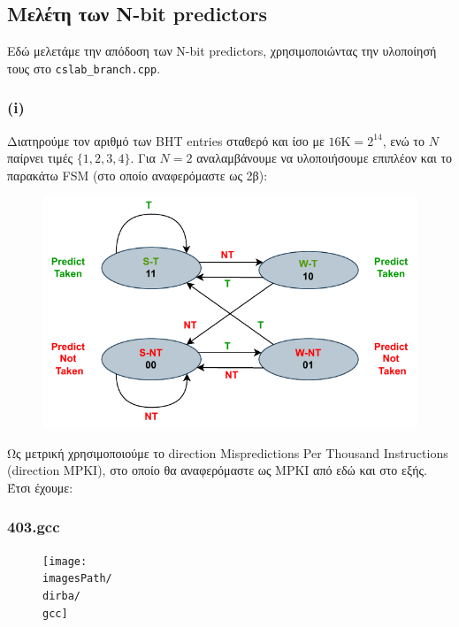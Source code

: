 \documentclass[12pt,a4paper]{article}
\newcommand{\imagesPath}{/home/nick/arch-ntua/ex02/graphs}
\newcommand{\gcc}{403.gcc.cslab_branch_predictors.out.pdf}
\newcommand{\dirba}{4.2/i}
\begin{document}
		\subsection{Μελέτη των N-bit predictors}
			Εδώ μελετάμε την απόδοση των N-bit predictors, χρησιμοποιώντας την υλοποίησή τους στο \verb|cslab_branch.cpp|.
		
			\subsubsection*{(i)}
				Διατηρούμε τον αριθμό των BHT entries σταθερό και ίσο με $16\text{K}=2^{14}$, ενώ το $N$ παίρνει τιμές $\{1, 2, 3, 4\}$. Για $N=2$ αναλαμβάνουμε να υλοποιήσουμε επιπλέον και το παρακάτω FSM (στο οποίο αναφερόμαστε ως 2β):
				
				\begin{figure}[H]
					\begin{center}
						\includegraphics[width=0.75\linewidth]{alternate-fsm.pdf}
					\end{center}
				\end{figure}
				
				Ως μετρική χρησιμοποιούμε το direction Mispredictions Per Thousand Instructions (direction MPKI), στο οποίο θα αναφερόμαστε ως MPKI από εδώ και στο εξής. Έτσι έχουμε:
				
				\subsubsection{403.gcc}
					\begin{figure}[H]
						\begin{center}
							 \texttt{[image: \\imagesPath/\\dirba/\\gcc]}
						\end{center}
					\end{figure}
\end{document}
